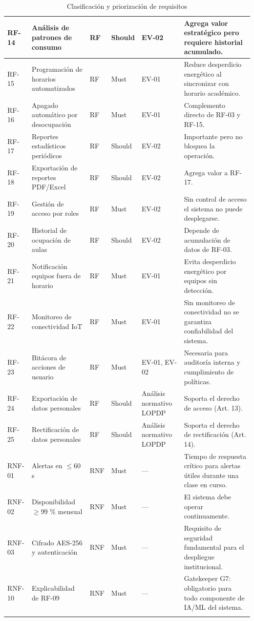 \begin{longtable}{|P{0.1667}|P{0.1667}|P{0.1667}|P{0.1667}|P{0.1667}|P{0.1667}|}
RF-14 & Análisis de patrones de consumo & RF & Should & EV-02 & Agrega valor estratégico pero requiere historial acumulado. \\ \hline
RF-15 & Programación de horarios automatizados & RF & Must & EV-01 & Reduce desperdicio energético al sincronizar con horario académico. \\ \hline
RF-16 & Apagado automático por desocupación & RF & Must & EV-01 & Complemento directo de RF-03 y RF-15. \\ \hline
RF-17 & Reportes estadísticos periódicos & RF & Should & EV-02 & Importante pero no bloquea la operación. \\ \hline
RF-18 & Exportación de reportes PDF/Excel & RF & Should & EV-02 & Agrega valor a RF-17. \\ \hline
RF-19 & Gestión de acceso por roles & RF & Must & EV-02 & Sin control de acceso el sistema no puede desplegarse. \\ \hline
RF-20 & Historial de ocupación de aulas & RF & Should & EV-02 & Depende de acumulación de datos de RF-03. \\ \hline
RF-21 & Notificación equipos fuera de horario & RF & Must & EV-01 & Evita desperdicio energético por equipos sin detección. \\ \hline
RF-22 & Monitoreo de conectividad IoT & RF & Must & EV-01 & Sin monitoreo de conectividad no se garantiza confiabilidad del sistema. \\ \hline
RF-23 & Bitácora de acciones de usuario & RF & Must & EV-01, EV-02 & Necesaria para auditoría interna y cumplimiento de políticas. \\ \hline
RF-24 & Exportación de datos personales & RF & Should & Análisis normativo LOPDP & Soporta el derecho de acceso (Art. 13). \\ \hline
RF-25 & Rectificación de datos personales & RF & Should & Análisis normativo LOPDP & Soporta el derecho de rectificación (Art. 14). \\ \hline
RNF-01 & Alertas en $\leq$60 s & RNF & Must & --- & Tiempo de respuesta crítico para alertas útiles durante una clase en curso. \\ \hline
RNF-02 & Disponibilidad $\geq$99 \% mensual & RNF & Must & --- & El sistema debe operar continuamente. \\ \hline
RNF-03 & Cifrado AES-256 y autenticación & RNF & Must & --- & Requisito de seguridad fundamental para el despliegue institucional. \\ \hline
RNF-10 & Explicabilidad de RF-09 & RNF & Must & --- & Gatekeeper G7: obligatorio para todo componente de IA/ML del sistema. \\ \hline
\caption{Clasificación y priorización de requisitos}
\end{longtable}
\endgroup

